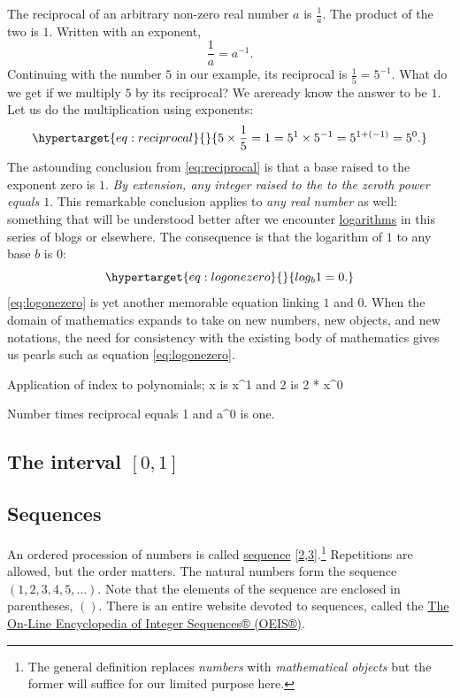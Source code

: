 \documentclass[
  a4paper,
]{article}
\begin{document}
The reciprocal of an arbitrary non-zero real number \(a\) is
\(\frac{1}{a}\). The product of the two is \(1\). Written with an
exponent, \[
\frac{1}{a} = a^{-1}.
\] Continuing with the number \(5\) in our example, its reciprocal is
\(\frac{1}{5} = 5^{-1}\). What do we get if we multiply \(5\) by its
reciprocal? We areready know the answer to be \(1\). Let us do the
multiplication using exponents:
\begin{equation}\protect\hypertarget{eq:reciprocal}{}{
5 \times \frac{1}{5} = 1 = 5^{1} \times 5^{-1} = 5^{1+(-1)} = 5^{0}.
}\label{eq:reciprocal}\end{equation} The astounding conclusion from
\cref{eq:reciprocal} is that a base raised to the exponent zero is
\({1}\). \emph{By extension, any integer raised to the to the zeroth
power equals \(1\)}. This remarkable conclusion applies to \emph{any
real number} as well: something that will be understood better after we
encounter
\href{https://www.britannica.com/science/logarithm}{logarithms} in this
series of blogs or elsewhere. The consequence is that the logarithm of
\(1\) to any base \(b\) is \(0\):
\begin{equation}\protect\hypertarget{eq:logonezero}{}{
log_{b}1 = 0.
}\label{eq:logonezero}\end{equation} \cref{eq:logonezero} is yet another
memorable equation linking \(1\) and \(0\). When the domain of
mathematics expands to take on new numbers, new objects, and new
notations, the need for consistency with the existing body of
mathematics gives us pearls such as equation \cref{eq:logonezero}.

Application of index to polynomials; x is x\^{}1 and 2 is 2 * x\^{}0

Number times reciprocal equals 1 and a\^{}0 is one.

\hypertarget{the-interval-0-1}{%
\subsection{\texorpdfstring{The interval
\([0, 1]\)}{The interval {[}0, 1{]}}}\label{the-interval-0-1}}

\hypertarget{sequences}{%
\subsection{Sequences}\label{sequences}}

An ordered procession of numbers is called
\href{https://en.wikipedia.org/w/index.php?title=Sequence\&oldid=1177801065}{sequence}
{[}\protect\hyperlink{ref-wikisequence}{2},\protect\hyperlink{ref-wolframsequence}{3}{]}.\footnote{The
  general definition replaces \emph{numbers} with \emph{mathematical
  objects} but the former will suffice for our limited purpose here.}
Repetitions are allowed, but the order matters. The natural numbers form
the sequence \((1, 2, 3, 4, 5, \ldots)\). Note that the elements of the
sequence are enclosed in parentheses, \(()\). There is an entire website
devoted to sequences, called the \href{https://oeis.org/}{The On-Line
Encyclopedia of Integer Sequences® (OEIS®)}.
\end{document}
